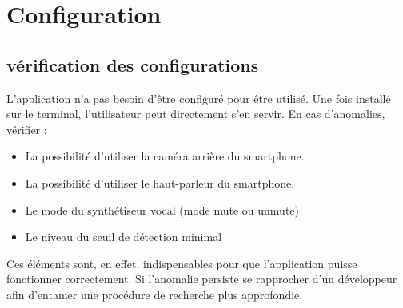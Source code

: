\documentclass[UTF8]{EPURapport}
\begin{document}
\chapter{Configuration}
\section{vérification des configurations}
L'application n'a pas besoin d'être configuré pour être utilisé. Une fois installé sur le terminal, l'utilisateur peut directement s'en servir. En cas d'anomalies, vérifier :
\begin{itemize}
  \item La possibilité d'utiliser la caméra arrière du smartphone.
  \item La possibilité d'utiliser le haut-parleur du smartphone.
  \item Le mode du synthétiseur vocal (mode mute ou unmute)
  \item Le niveau du seuil de détection minimal
\end{itemize}

Ces éléments sont, en effet, indispensables pour que l'application puisse fonctionner correctement. Si l'anomalie persiste se rapprocher d'un développeur afin d'entamer une procédure de recherche plus approfondie.
\end{document}
